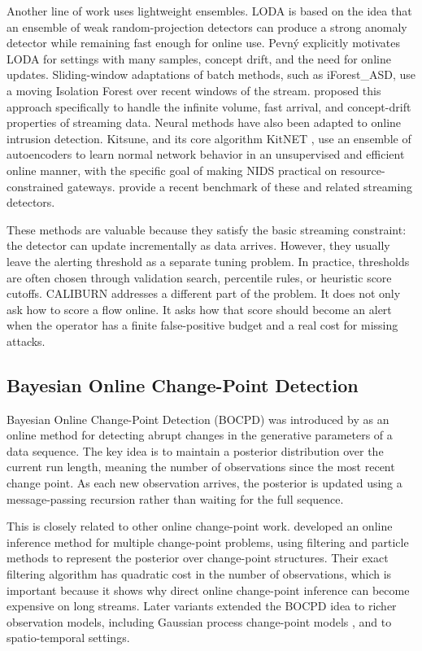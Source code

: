 \documentclass[preprint,12pt,authoryear]{elsarticle}
\newcommand{\caliburn}{CALIBURN}
\begin{document}
Another line of work uses lightweight ensembles. LODA \citep{pevny2016loda} is based on the idea that an ensemble of weak random-projection detectors can produce a strong anomaly detector while remaining fast enough for online use. Pevn{\'y} explicitly motivates LODA for settings with many samples, concept drift, and the need for online updates. Sliding-window adaptations of batch methods, such as iForest\_ASD, use a moving Isolation Forest over recent windows of the stream. \citet{ding2013iforestasd} proposed this approach specifically to handle the infinite volume, fast arrival, and concept-drift properties of streaming data. Neural methods have also been adapted to online intrusion detection. Kitsune, and its core algorithm KitNET \citep{mirsky2018kitsune}, use an ensemble of autoencoders to learn normal network behavior in an unsupervised and efficient online manner, with the specific goal of making NIDS practical on resource-constrained gateways. \citet{cao2025revisiting} provide a recent benchmark of these and related streaming detectors.

These methods are valuable because they satisfy the basic streaming constraint: the detector can update incrementally as data arrives. However, they usually leave the alerting threshold as a separate tuning problem. In practice, thresholds are often chosen through validation search, percentile rules, or heuristic score cutoffs. \caliburn{} addresses a different part of the problem. It does not only ask how to score a flow online. It asks how that score should become an alert when the operator has a finite false-positive budget and a real cost for missing attacks.

\subsection{Bayesian Online Change-Point Detection}
\label{sec:bg-bocpd}

Bayesian Online Change-Point Detection (BOCPD) was introduced by \citet{adams2007bayesian} as an online method for detecting abrupt changes in the generative parameters of a data sequence. The key idea is to maintain a posterior distribution over the current run length, meaning the number of observations since the most recent change point. As each new observation arrives, the posterior is updated using a message-passing recursion rather than waiting for the full sequence.

This is closely related to other online change-point work. \citet{fearnhead2007online} developed an online inference method for multiple change-point problems, using filtering and particle methods to represent the posterior over change-point structures. Their exact filtering algorithm has quadratic cost in the number of observations, which is important because it shows why direct online change-point inference can become expensive on long streams. Later variants extended the BOCPD idea to richer observation models, including Gaussian process change-point models \citep{saatci2010gaussian}, and to spatio-temporal settings.
\end{document}
